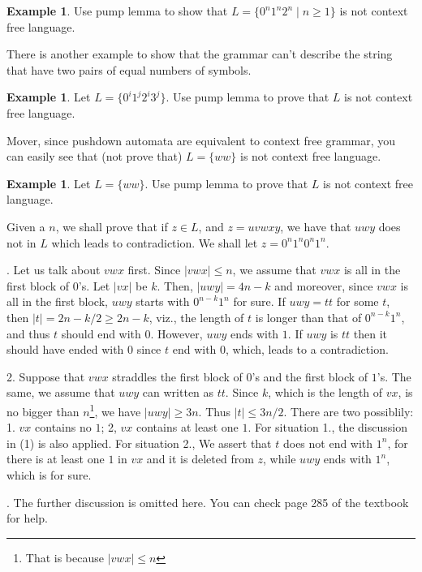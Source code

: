 \documentclass[12pt]{article}
\theoremstyle{definition}
\newtheorem{exam}[definition]{Example}
\theoremstyle{remark}
\begin{document}
\begin{exam}
	Use pump lemma to show that \(L = \{ 0 ^{n} 1 ^{n} 2 ^{n} \mid n \ge 1 \}\) is not context free language.
\end{exam}
There is another example to show that the grammar can't describe the string that have two pairs of equal numbers of symbols. 
\begin{exam}
	Let \(L = \{ 0 ^{i} 1 ^{j} 2 ^{i} 3 ^{j} \}\). Use pump lemma to prove that \(L\) is not context free language. 
\end{exam}
Mover, since pushdown automata are equivalent to context free grammar, you can easily see that (not prove that) 
\(L =  \{ ww\}\) is not context  free language. 
\begin{exam}
	Let \(L = \{ ww \}\). Use pump lemma to prove that \(L\) is not context free language.

	Given a \(n\), we shall prove that if \(z \in L\), and \(z  =  uv w xy\), we have that \( u w y\) does not in \(L\) which leads to
	contradiction.  We shall let \(z =  0 ^{n} 1 ^{n} 0 ^{n} 1 ^{n}\). 

	\setlength{\hangindent}{33pt} 
	. Let us talk about \( v w x \) first. Since \( |v w x | \le n\), we assume that \(v w x \) is all in the first 
	block of \(0\)'s. Let \( |v x |\) be \(k\). Then, \( |  u w y | = 4n - k\) and moreover, since \(v w x\) is all 
	in the first block, \( u w y \) starts with \( 0 ^{n - k} 1 ^{n}\) for sure. If \( u w  y = tt\) for some \(t\),
	then \( |t| = 2n - k/2 \ge 2n - k\), viz., the length of \(t\) is longer than that of \( 0 ^{n - k} 1 ^{n}\), and 
	thus \(t\) should end with \(0\). However, \( uwy \) ends with \(1\). If \( u wy\) is \(tt\) then it should have ended 
	with \(0\) since \(t\) end with \(0\), which, leads to a contradiction.
	\medskip

	2. Suppose that \( v w x\) straddles the first block of \(0\)'s and the first block of \(1\)'s.	
	The same, we assume that \( u w y\) can written as \(tt\). Since \(k\), which is the length of 
	\(v x\), is no bigger than \(n\)\footnote{That is because \(|v w x| \le n\)}, we have \( |uwy| \ge 3n\).
	Thus \( |t | \le 3n / 2\). There are two possiblily: 1. \( v x \) contains no \(1\); 2, \(v x\) contains 
	at least one \(1\). For situation 1., the discussion in (1) is also applied. For situation 2., We assert 
	that \(t\) does not end with \(1 ^{n}\), for there is at least one \(1\) in \(v x\) and it is deleted from 
	\(z\), while \( uw y\) ends with \(1^{n}\), which is for sure.

	. The further discussion is omitted here.  You can check page 285 of the textbook for help.
\end{exam}
\end{document}
